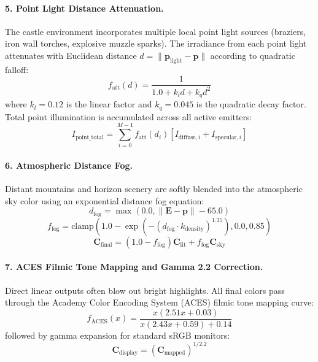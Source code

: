 \documentclass[11pt,a4paper]{article}
\begin{document}
\paragraph{5. Point Light Distance Attenuation.}
The castle environment incorporates multiple local point light sources (braziers, iron wall torches, explosive muzzle sparks). The irradiance from each point light attenuates with Euclidean distance $d = \|\mathbf{p}_{\text{light}} - \mathbf{p}\|$ according to quadratic falloff:
\begin{equation}
  f_{\text{att}}(d) = \frac{1}{1.0 + k_l d + k_q d^2}
\end{equation}
where $k_l = 0.12$ is the linear factor and $k_q = 0.045$ is the quadratic decay factor. Total point illumination is accumulated across all active emitters:
\begin{equation}
  I_{\text{point\_total}} = \sum_{i=0}^{M-1} f_{\text{att}}(d_i) \left[ I_{\text{diffuse}, i} + I_{\text{specular}, i} \right]
\end{equation}

\paragraph{6. Atmospheric Distance Fog.}
Distant mountains and horizon scenery are softly blended into the atmospheric sky color using an exponential distance fog equation:
\begin{equation}
  d_{\text{fog}} = \max(0.0, \|\mathbf{E} - \mathbf{p}\| - 65.0)
\end{equation}
\begin{equation}
  f_{\text{fog}} = \text{clamp}\left(1.0 - \exp\left( - (d_{\text{fog}} \cdot k_{\text{density}})^{1.35} \right), 0.0, 0.85\right)
\end{equation}
\begin{equation}
  \mathbf{C}_{\text{final}} = (1.0 - f_{\text{fog}}) \mathbf{C}_{\text{lit}} + f_{\text{fog}} \mathbf{C}_{\text{sky}}
\end{equation}

\paragraph{7. ACES Filmic Tone Mapping and Gamma 2.2 Correction.}
Direct linear outputs often blow out bright highlights. All final colors pass through the Academy Color Encoding System (ACES) filmic tone mapping curve:
\begin{equation}
  f_{\text{ACES}}(x) = \frac{x(2.51 x + 0.03)}{x(2.43 x + 0.59) + 0.14}
\end{equation}
followed by gamma expansion for standard sRGB monitors:
\begin{equation}
  \mathbf{C}_{\text{display}} = (\mathbf{C}_{\text{mapped}})^{1/2.2}
\end{equation}
\end{document}

